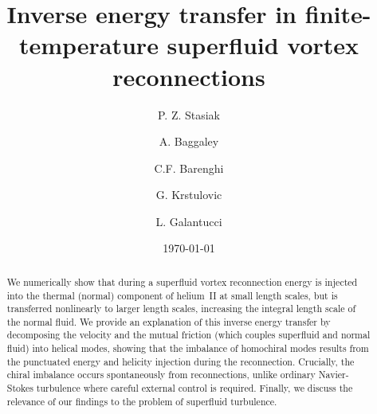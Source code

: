 \documentclass[%
 reprint,
 amsmath,amssymb,
 aps,
 prl,
]{revtex4-2}
\begin{document}

\title{Inverse energy transfer in finite-temperature superfluid vortex reconnections}

\author{P. Z. Stasiak}
\author{A. Baggaley}
\author{C.F. Barenghi}

\author{G. Krstulovic}

\author{L. Galantucci}

\date{\today}%

\begin{abstract}
We numerically show that during a superfluid vortex reconnection energy is injected 
into the thermal (normal) component of helium~II at small length scales, but is transferred nonlinearly  to larger length scales, increasing the integral length scale of the normal
fluid.  We provide an explanation of this inverse energy transfer by decomposing the velocity and 
the mutual friction (which couples superfluid and normal fluid) into helical modes, showing 
that the imbalance of homochiral modes results from the punctuated energy and helicity 
injection during the reconnection. Crucially, the
chiral imbalance occurs spontaneously from reconnections, unlike ordinary Navier-Stokes turbulence
where careful external control is required. Finally, we discuss the relevance of our findings to 
the problem of superfluid turbulence.
\end{abstract}

\maketitle
\end{document}
